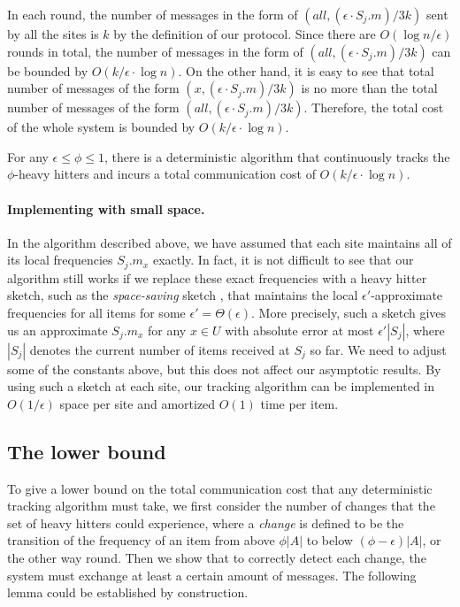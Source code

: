 \documentclass[10pt]{article}
\newcommand{\eps}{\epsilon}
\begin{document}
In each round, the number of messages in the form of $(all, (\eps \cdot
{S_j}.m)/3k)$ sent by all the sites is $k$ by the definition of our
protocol. Since there are $O(\log n/ \eps)$ rounds in total, the number of
messages in the form of $(all, (\eps \cdot {S_j}.m)/3k)$ can be bounded by
$O(k/\eps \cdot \log n)$. On the other hand, it is easy to see that total
number of messages of the form $(x, (\eps \cdot S_j.m)/3k)$ is no more than
the total number of messages of the form $(all, (\eps \cdot S_j.m)/3k)$.
Therefore, the total cost of the whole system is bounded by
$O(k/\eps \cdot \log n)$.


\begin{theorem}
For any $\eps \le \phi \le 1$, there is a deterministic algorithm that
  continuously tracks the $\phi$-heavy hitters and incurs a total
  communication cost of 
  $O(k/\eps\cdot \log n)$.
\end{theorem}

\paragraph{Implementing with small space.}
In the algorithm described above, we have assumed that each site maintains
all of its local frequencies $S_j.m_x$ exactly.  In fact, it is not
difficult to see that our algorithm still works if we replace these exact
frequencies with a heavy hitter sketch, such as the {\em space-saving}
sketch \cite{metwally06}, that maintains the local $\eps'$-approximate
frequencies for all items for some $\eps' = \Theta(\eps)$.  More precisely,
such a sketch gives us an approximate $S_j.m_x$ for any $x\in U$ with
absolute error at most $\eps' |S_j|$, where $|S_j|$ denotes the current
number of items received at $S_j$ so far.  We need to adjust some of the
constants above, but this does not affect our asymptotic results.  By using
such a sketch at each site, our tracking algorithm can be implemented in
$O(1/\eps)$ space per site and amortized $O(1)$ time per item.

\subsection{The lower bound} \label{sec:lower-bound-heavy-hitt}

To give a lower bound on the total communication cost that any
deterministic tracking algorithm must take, we first consider the number of
changes that the set of heavy hitters could experience, where a {\em
  change} is defined to be the transition of the frequency of an item from
above $\phi|A|$ to below $(\phi-\eps)|A|$, or the other way round.  Then we
show that to correctly detect each change, the system must exchange at
least a certain amount of messages. The following lemma could be
established by construction.
\end{document}
